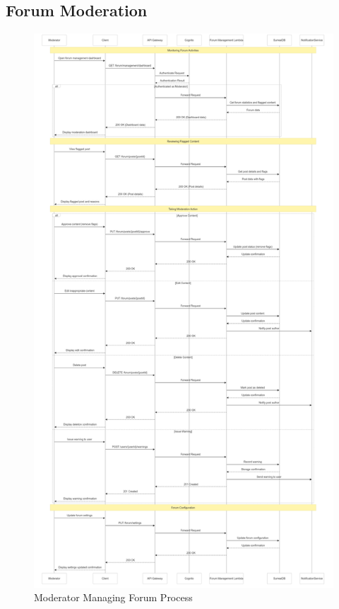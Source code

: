 \documentclass[a4paper, 11pt]{scrreprt}
\begin{document}
\subsection{Forum Moderation}
\begin{figure}[!htb]
    \centering
    \includegraphics[height=0.9\textheight]{moderator_managing_forum.png}
    \caption{Moderator Managing Forum Process}
\end{figure}
\end{document}
